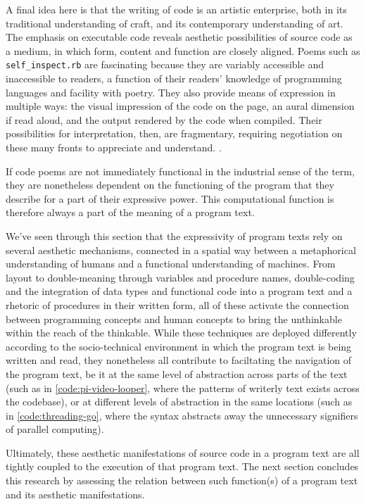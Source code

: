 A final idea here is that the writing of code is an artistic enterprise, both in its traditional understanding of craft, and its contemporary understanding of art. The emphasis on executable code reveals aesthetic possibilities of source code as a medium, in which form, content and function are closely aligned. Poems such as \lstinline{self_inspect.rb} are fascinating because they are variably accessible and inaccessible to readers, a function of their readers' knowledge of programming languages and facility with poetry. They also provide means of expression in multiple ways: the visual impression of the code on the page, an aural dimension if read aloud, and the output rendered by the code when compiled. Their possibilities for interpretation, then, are fragmentary, requiring negotiation on these many fronts to appreciate and understand. \citep{risam_poetry_2015}.

If code poems are not immediately functional in the industrial sense of the term, they are nonetheless dependent on the functioning of the program that they describe for a part of their expressive power. This computational function is therefore always a part of the meaning of a program text.

\spacersmall

We've seen through this section that the expressivity of program texts rely on several aesthetic mechanisms, connected in a spatial way between a metaphorical understanding of humans and a functional understanding of machines. From layout to double-meaning through variables and procedure names, double-coding and the integration of data types and functional code into a program text and a rhetoric of procedures in their written form, all of these activate the connection between programming concepts and human concepts to bring the unthinkable within the reach of the thinkable. While these techniques are deployed differently according to the socio-technical environment in which the program text is being written and read, they nonetheless all contribute to faciltating the navigation of the program text, be it at the same level of abstraction across parts of the text (such as in \autoref{code:pi-video-looper}, where the patterns of writerly text exists across the codebase), or at different levels of abstraction in the same locations (such as in \autoref{code:threading-go}, where the syntax abstracts away the unnecessary signifiers of parallel computing).

Ultimately, these aesthetic manifestations of source code in a program text are all tightly coupled to the execution of that program text. The next section concludes this research by assessing the relation between such function(s) of a program text and its aesthetic manifestations.

